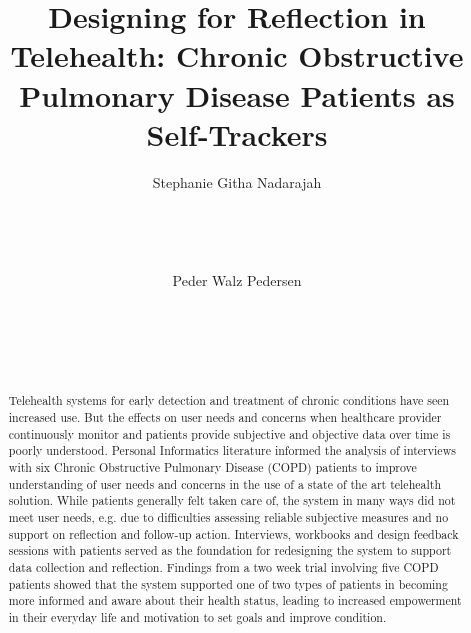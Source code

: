 \documentclass{sigchi}
\begin{document}
\title{Designing for Reflection in Telehealth: Chronic Obstructive Pulmonary Disease Patients as Self-Trackers}

\author{
      \alignauthor Stephanie Githa Nadarajah\\
\\
    \\
        \\
    \\
     \alignauthor Peder Walz Pedersen\\
\\
    \\
        \\
    \\
}

\maketitle

\begin{abstract}
Telehealth systems for early detection and treatment of chronic conditions have seen increased use. But the effects on user needs and concerns when healthcare provider continuously monitor and patients provide subjective and objective data over time is poorly understood. Personal Informatics literature informed the analysis of interviews with six Chronic Obstructive Pulmonary Disease (COPD) patients to improve understanding of user needs and concerns in the use of a state of the art telehealth solution. While patients generally felt taken care of, the system in many ways did not meet user needs, e.g. due to difficulties assessing reliable subjective measures and no support on reflection and follow-up action. Interviews, workbooks and design feedback sessions with patients served as the foundation for redesigning the system to support data collection and reflection. Findings from a two week trial involving five COPD patients showed that the system supported one of two types of patients in becoming more informed and aware about their health status, leading to increased empowerment in their everyday life and motivation to set goals and improve condition.
\end{abstract}

\end{document}

